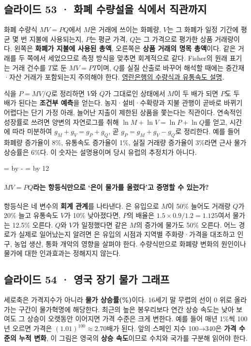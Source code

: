 \documentclass[10pt,a4paper]{article}
\newcommand{\ReserveQuestionSpace}{%
  \par\begingroup
  \dimen0=\pagegoal \advance\dimen0 by -\pagetotal
  \dimen2=\baselineskip \multiply\dimen2 by 12
  \ifdim\dimen0<\dimen2 \newpage\fi
  \endgroup}
\begin{document}
\subsection{슬라이드 53 · 화폐 수량설을 식에서 직관까지}
화폐 수량식 $MV=PQ$에서 $M$은 거래에 쓰이는 화폐량, $V$는 그 화폐가 일정 기간에 평균 몇 번 지불에 사용되는지, $P$는 평균 가격, $Q$는 그 가격으로 평가한 상품 거래량이다. 왼쪽은 \textbf{화폐가 지불에 사용된 총액}, 오른쪽은 \textbf{상품 거래의 명목 총액}이다. 같은 거래를 두 쪽에서 세었으므로 측정 방식을 맞추면 회계적으로 같다. Fisher의 원래 표기는 거래 건수를 $T$로 둔 $MV=PT$이며, $Q$를 실질 산출로 바꾸어 해석할 때에는 중간재·자산 거래가 포함되는지 주의해야 한다. \href{https://www.bankofengland.co.uk/-/media/boe/files/speech/2009/money-banks-and-quantitative-easing.pdf}{영란은행의 수량식과 유통속도 설명}.\par

식을 $P=MV/Q$로 정리하면 $V$와 $Q$가 그대로인 상태에서 $M$이 두 배가 되면 $P$도 두 배가 된다는 \textbf{조건부 예측}을 얻는다. 농지·설비·수확량과 지불 관행이 곧바로 바뀌기 어렵다는 단기 가정 아래, 늘어난 지출이 제한된 상품을 쫓는다는 직관이다. 연속적인 성장률로 쓰려면 양변의 자연로그를 취해 $\ln M+\ln V=\ln P+\ln Q$를 얻고, 시간에 따라 미분하여 $g_M+g_V=g_P+g_Q$, 곧 $g_P=g_M+g_V-g_Q$로 정리한다. 예를 들어 화폐량 증가율이 8\%, 유통속도 증가율이 1\%, 실질 거래량 증가율이 3\%라면 근사 물가 상승률은 6\%다. 이 숫자는 설명용이며 당시 유럽의 추정치가 아니다.\par

\ReserveQuestionSpace
\paragraph{$MV=PQ$라는 항등식만으로 ‘은이 물가를 올렸다’고 증명할 수 있는가?}
항등식은 네 변수의 \textbf{회계 관계}를 나타낸다. 은 유입으로 $M$이 50\% 늘어도 거래량 $Q$가 20\% 늘고 유통속도 $V$가 10\% 낮아졌다면, $P$의 배율은 $1.5\times0.9/1.2=1.125$여서 물가는 12.5\% 오른다. $Q$와 $V$가 일정했다면 같은 $M$의 증가에 물가도 50\% 오른다. 어느 경로가 실제로 일어났는지 알려면 은 유입의 시점과 지역별 주화량·가격을 대조하고 인구, 농업 생산, 통화 개악의 영향을 살펴야 한다. 수량식만으로 화폐량 변화의 원인이나 물가에 대한 인과효과는 정해지지 않는다.\par

\subsection{슬라이드 54 · 영국 장기 물가 그래프}
세로축은 가격지수가 아니라 \textbf{물가 상승률(\%)}이다. 16세기 말 무렵의 선이 0 위로 올라가는 구간이 물가혁명에 해당한다. 최근의 높은 봉우리보다 연간 상승 속도는 낮아 보여도 그 상승이 오랫동안 이어지면 가격 수준은 크게 변한다. 예를 들어 매년 1\%씩 100년 오르면 가격은 $(1.01)^{100}\approx2.70$배가 된다. 앞의 스페인 지수 100→340은 \textbf{가격 수준의 누적 변화}, 이 그림은 영국의 \textbf{상승 속도}이므로 수치와 국가를 구분해 읽어야 한다.\par
\end{document}
